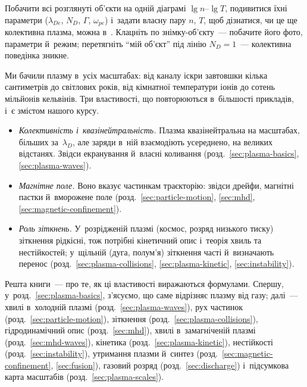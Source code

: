 \begin{Simulation}
Побачити всі розглянуті об'єкти на одній діаграмі $\lg n$--$\lg T$, подивитися їхні параметри ($\lambda_{De}$, $N_D$, $\Gamma$, $\omega_{pe}$) і~задати власну пару $n$, $T$, щоб дізнатися, чи це ще колективна плазма, можна в~. Клацніть по знімку-об'єкту~--- побачите його фото, параметри й~режим; перетягніть \enquote{мій об'єкт} під лінію $N_D=1$~--- колективна поведінка зникне.
\end{Simulation}

Ми бачили плазму в~усіх масштабах: від каналу іскри завтовшки кілька сантиметрів до світлових років, від кімнатної температури іонів до сотень мільйонів кельвінів. Три властивості,
що повторюються в~більшості прикладів, і~є змістом нашого курсу.

\begin{itemize}
	\item \emph{Колективність і~квазінейтральність.} Плазма квазінейтральна на масштабах, більших за~$\lambda_D$, але заряди в~ній взаємодіють усереднено, на великих відстанях. Звідси екранування й~власні коливання
	(розд.~\ref{sec:plasma-basics}, \ref{sec:plasma-waves}).
	\item \emph{Магнітне поле.} Воно вказує частинкам траєкторію: звідси дрейфи, магнітні пастки й~вморожене поле (розд.~\ref{sec:particle-motion}, \ref{sec:mhd}, \ref{sec:magnetic-confinement}).
	\item \emph{Роль зіткнень.} У~розрідженій плазмі (космос, розряд низького тиску) зіткнення рідкісні, тож потрібні кінетичний опис і~теорія хвиль та нестійкостей; у~щільній (дуга, полум'я)
	зіткнення часті й~визначають перенос (розд.~\ref{sec:plasma-collisions}, \ref{sec:plasma-kinetic}, \ref{sec:instability}).
\end{itemize}

Решта книги~--- про те, як ці властивості виражаються формулами. Спершу, у~розд.~\ref{sec:plasma-basics}, з'ясуємо, що саме відрізняє плазму від газу; далі~--- хвилі в~холодній плазмі (розд.~\ref{sec:plasma-waves}),
рух частинок (розд.~\ref{sec:particle-motion}), зіткнення (розд.~\ref{sec:plasma-collisions}), гідродинамічний опис (розд.~\ref{sec:mhd}), хвилі в~замагніченій плазмі (розд.~\ref{sec:mhd-waves}),
кінетика (розд.~\ref{sec:plasma-kinetic}), нестійкості (розд.~\ref{sec:instability}), утримання плазми й~синтез (розд.~\ref{sec:magnetic-confinement}, \ref{sec:fusion}), газовий розряд (розд.~\ref{sec:discharge})
і~підсумкова карта масштабів (розд.~\ref{sec:plasma-scales}).

